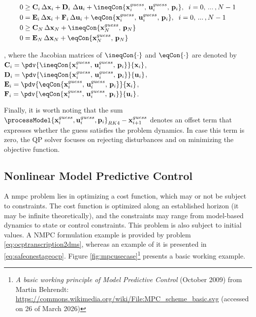 \begin{subequations}
\begin{align}
		0 &\geq \mathbf{C}_i\,\Delta \mathbf{x}_i + \mathbf{D}_i \,\,\Delta \mathbf{u}_i + \ineqCon{\mathbf{x}_i^{guess},\, \mathbf{u}_i^{guess},\,\mathbf{p}_i}, \hspace{0.2cm} i= 0,\,...\,,N-1 \label{subeq:qpnonlinearcons}\\
		0 &= \mathbf{E}_i \, \Delta \mathbf{x}_i + \mathbf{F}_i \, \Delta \mathbf{u}_i + \eqCon{\mathbf{x}_i^{guess},\,\mathbf{u}_i^{guess},\,\mathbf{p}_i}, \hspace{0.2cm} i= 0,\,...\,,N-1 \label{subeq:qplinearcons}\\
		0 &\geq \mathbf{C}_N \, \Delta \mathbf{x}_N + \ineqCon{\mathbf{x}_N^{guess},\,\mathbf{p}_N}\\
		0 &= \mathbf{E}_N \, \Delta \mathbf{x}_N + \eqCon{\mathbf{x}_N^{guess},\,\mathbf{p}_N}
	\end{align}
\end{subequations}

\noindent , where the Jacobian matrices of $\ineqCon{\cdot}$ and $\eqCon{\cdot}$ are denoted by $\mathbf{C}_i = \pdv{\ineqCon{\mathbf{x}_i^{guess},\,\mathbf{u}_i^{guess},\,\mathbf{p}_i}}{\mathbf{x}_i}$, $\mathbf{D}_i = \pdv{\ineqCon{\mathbf{x}_i^{guess},\,\mathbf{u}_i^{guess},\,\mathbf{p}_i}}{\mathbf{u}_i}$, $\mathbf{E}_i = \pdv{\eqCon{\mathbf{x}_i^{guess},\,\mathbf{u}_i^{guess},\,\mathbf{p}_i}}{\mathbf{x}_i}$, $\mathbf{F}_i = \pdv{\eqCon{\mathbf{x}_i^{guess},\,\mathbf{u}_i^{guess},\,\mathbf{p}_i}}{\mathbf{u}_i}$.

Finally, it is worth noting that the sum $\processModel{\mathbf{x}_i^{guess}, \mathbf{u}_i^{guess}, \mathbf{p}_i}_{RK4} - \mathbf{x}_{i+1}^{guess}$ denotes an offset term that expresses whether the guess satisfies the problem dynamics. In case this term is zero, the QP solver focuses on rejecting disturbances and on minimizing the objective function. 

\subsection{Nonlinear Model Predictive Control}
\label{subsection:nmpc}

A \acrshort{nmpc} problem \cite{Rawlings2013, grunenmpc} lies in optimizing a cost function, which may or not be subject to constraints. The cost function is optimized along an established horizon (it may be infinite theoretically), and the constraints may range from model-based dynamics to state or control constraints. This problem is also subject to initial values. A NMPC formulation example is provided by problem \eqref{eq:ocptranscription2dms}, whereas an example of it is presented in \eqref{eq:safeonestageocp}. Figure \ref{fig:mpcusecase}\footnote{\textit{A basic working principle of Model Predictive Control} (October 2009) from  Martin Behrendt: \url{https://commons.wikimedia.org/wiki/File:MPC_scheme_basic.svg} (accessed on 26 of March 2026)} presents a basic working example.

